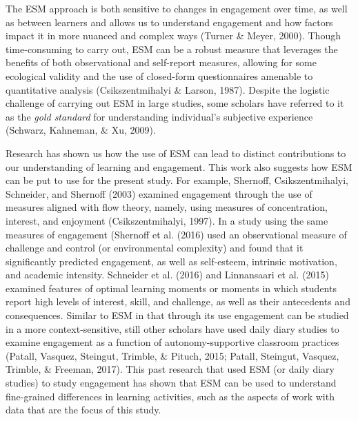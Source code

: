 \documentclass[]{msu-thesis}
\theoremstyle{definition}
\theoremstyle{definition}
\theoremstyle{definition}
\theoremstyle{remark}
\begin{document}
The ESM approach is both sensitive to changes in engagement over time,
as well as between learners and allows us to understand engagement and
how factors impact it in more nuanced and complex ways (Turner \& Meyer,
2000). Though time-consuming to carry out, ESM can be a robust measure
that leverages the benefits of both observational and self-report
measures, allowing for some ecological validity and the use of
closed-form questionnaires amenable to quantitative analysis
(Csikszentmihalyi \& Larson, 1987). Despite the logistic challenge of
carrying out ESM in large studies, some scholars have referred to it as
the \emph{gold standard} for understanding individual's subjective
experience (Schwarz, Kahneman, \& Xu, 2009).

Research has shown us how the use of ESM can lead to distinct
contributions to our understanding of learning and engagement. This work
also suggests how ESM can be put to use for the present study. For
example, Shernoff, Csikszentmihalyi, Schneider, and Shernoff (2003)
examined engagement through the use of measures aligned with flow
theory, namely, using measures of concentration, interest, and enjoyment
(Csikszentmihalyi, 1997). In a study using the same measures of
engagement (Shernoff et al. (2016) used an observational measure of
challenge and control (or environmental complexity) and found that it
significantly predicted engagement, as well as self-esteem, intrinsic
motivation, and academic intensity. Schneider et al. (2016) and
Linnansaari et al. (2015) examined features of optimal learning moments
or moments in which students report high levels of interest, skill, and
challenge, as well as their antecedents and consequences. Similar to ESM
in that through its use engagement can be studied in a more
context-sensitive, still other scholars have used daily diary studies to
examine engagement as a function of autonomy-supportive classroom
practices (Patall, Vasquez, Steingut, Trimble, \& Pituch, 2015; Patall,
Steingut, Vasquez, Trimble, \& Freeman, 2017). This past research that
used ESM (or daily diary studies) to study engagement has shown that ESM
can be used to understand fine-grained differences in learning
activities, such as the aspects of work with data that are the focus of
this study.
\end{document}
